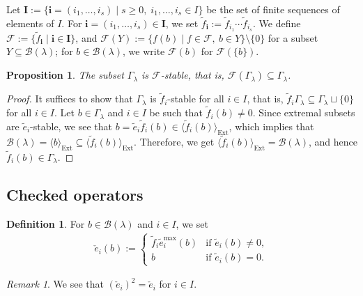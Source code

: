\documentclass[reqno]{amsart}
\newtheorem{proposition}[theorem]{Proposition}
\theoremstyle{definition}
\newtheorem{definition}[theorem]{Definition}
\theoremstyle{remark}
\newtheorem{remark}[theorem]{Remark}
\numberwithin{equation}{section}
\newcommand{\B}{\mathcal{B}}
\newcommand{\F}{\mathcal{F}}
\newcommand{\Ext}{\operatorname{Ext}}
\newcommand{\Gl}{\Gamma_\lambda}
\newcommand{\te}{\tilde e}
\newcommand{\tf}{\tilde f}
\newcommand{\chke}{\check e}
\newcommand{\Bl}{\B(\lambda)}
\begin{document}
	Let $\mathbf{I}:=\{\mathbf{i}=(i_1,\dots,i_s)\mid s\ge 0,\;i_1,\dots,i_s\in I\}$ be the set of finite sequences of elements of $I$.
	For $\mathbf{i}=(i_1,\dots,i_s)\in\mathbf{I}$,
	we set $\tf_{\mathbf{i}}:=\tf_{i_1}\cdots\tf_{i_s}$.
	We define $\F:=\{\tf_{\mathbf{i}}\mid\mathbf{i}\in\mathbf{I}\}$,
	and $\F(Y):=\{f(b)\mid f\in\F,\ b\in Y\}\setminus\{0\}$ for a subset $Y\subseteq\Bl$;
	for $b\in\Bl$, we write $\F(b)$ for $\F(\{b\})$.
	
	\begin{proposition}\label{prop:Gl-F-stable}
		The subset $\Gl$ is $\F$-stable,
		that is, $\F(\Gl)\subseteq\Gl$.
	\end{proposition}
	\begin{proof}
		It suffices to show that $\Gl$ is $\tf_i$-stable for all $i\in I$,
		that is, $\tf_i\Gl\subseteq\Gl\sqcup\{0\}$ for all $i\in I$.
		Let $b\in\Gl$ and $i\in I$ be such that $\tf_i(b)\ne0$.
		Since extremal subsets are $\te_i$-stable, we see that $b=\te_i\tf_i(b)\in\langle\tf_i(b)\rangle_{\Ext}$,
		which implies that $\Bl=\langle b\rangle_{\Ext}\subseteq\langle\tf_i(b)\rangle_{\Ext}.$
		Therefore, we get $\langle\tf_i(b)\rangle_{\Ext}=\Bl$,
		and hence $\tf_i(b)\in\Gl$.
	\end{proof}
	
	\subsection{Checked operators}\label{subsec:checked-operator}
	
	\begin{definition}\label{def:chke}
		For $b\in\Bl$ and $i\in I$, we set
		\begin{align}
			\chke_i(b):=
			\begin{cases}
				\tf_i\te_i^{\max}(b) & \text{if }\te_i(b)\ne0,\\
				b & \text{if }\te_i(b)=0.
			\end{cases}
		\end{align}
	\end{definition}
	\begin{remark}\label{rem:chkechke=chke}
		We see that $(\chke_i)^2=\chke_i$ for $i\in I$.
	\end{remark}
	
\end{document}

